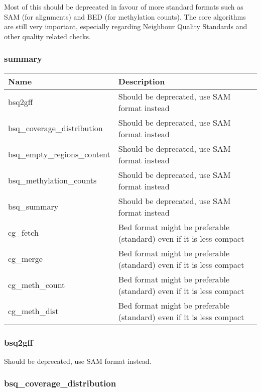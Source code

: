 \documentclass[a4paper,12pt]{article}
\begin{document}
Most of this should be deprecated in favour of more standard formats such as
SAM (for alignments) and BED (for methylation counts).
The core algorithms are still very important, especially regarding Neighbour
Quality Standards and other quality related checks.

\subsubsection{summary}

\begin{tabularx}{\textwidth}{|X|X|}
    \hline
    \textbf{Name}                   & \textbf{Description} \\
    \hline
    \hline
    bsq2gff                         & Should be deprecated, use SAM format instead \\
    bsq\_coverage\_distribution     & Should be deprecated, use SAM format instead \\
    bsq\_empty\_regions\_content    & Should be deprecated, use SAM format instead \\
    bsq\_methylation\_counts        & Should be deprecated, use SAM format instead \\
    bsq\_summary                    & Should be deprecated, use SAM format instead \\
    cg\_fetch                       & Bed format might be preferable (standard) even if it is less compact \\
    cg\_merge                       & Bed format might be preferable (standard) even if it is less compact \\
    cg\_meth\_count                 & Bed format might be preferable (standard) even if it is less compact \\
    cg\_meth\_dist                  & Bed format might be preferable (standard) even if it is less compact \\
    \hline
\end{tabularx}

\subsubsection{bsq2gff}

Should be deprecated, use SAM format instead.

\subsubsection{bsq\_coverage\_distribution}
\end{document}
